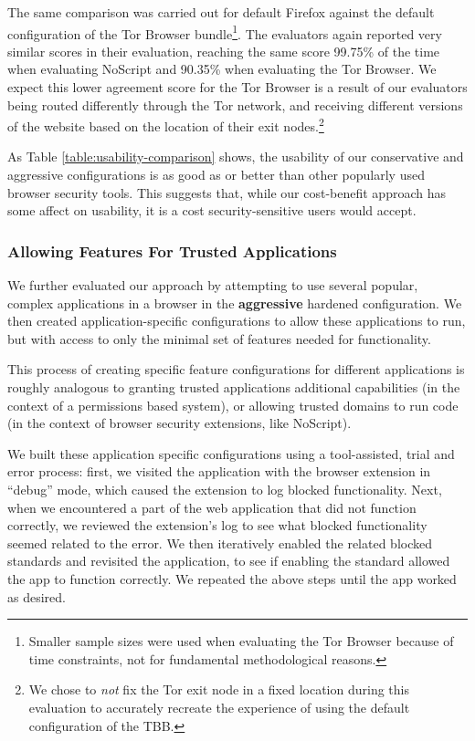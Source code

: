 The same comparison was carried out for default Firefox against
the default configuration of the Tor Browser bundle\footnote{Smaller sample
sizes were used when evaluating the Tor Browser because of time constraints,
not for fundamental methodological reasons.}.  The evaluators again
reported very similar scores in their evaluation, reaching the same score
99.75\% of the time when evaluating NoScript and 90.35\% when evaluating the
Tor Browser.  We expect this lower agreement score for the Tor Browser is
a result of our evaluators being routed differently through the Tor network, and
receiving different versions of the website based on the location of their
exit nodes.\footnote{We chose to \emph{not} fix the Tor exit node in a fixed
location during this evaluation to accurately recreate the experience of using
the default configuration of the TBB.}

As Table \ref{table:usability-comparison} shows, the usability of our
conservative and aggressive configurations is as good as or better than other
popularly used browser security tools.  This suggests that, while
our \WASs cost-benefit approach has some affect on usability, it is a
cost security-sensitive users would accept.


\subsubsection{Allowing Features For Trusted Applications}
We further evaluated our approach by attempting to use several popular,
complex \JS applications in a browser in the \textbf{aggressive} hardened
configuration.  We then created application-specific configurations to allow
these applications to run, but with access to only the minimal set of
features needed for functionality.

This process of creating specific feature configurations for different
applications is roughly analogous to granting trusted applications additional
capabilities (in the context of a permissions based system), or allowing trusted
domains to run \JS code (in the context of browser security extensions, like
NoScript).

We built these application specific configurations using a tool-assisted,
trial and error process: first, we visited the application with the browser
extension in ``debug'' mode,
which caused the extension to log blocked functionality.  Next,
when we encountered a part of the web application that did not function correctly,
we reviewed the extension's log to see what blocked functionality seemed
related to the error.  We then iteratively enabled the related blocked
standards and revisited the application, to see if enabling the standard
allowed the app to function correctly.  We repeated the above steps
until the app worked as desired.

